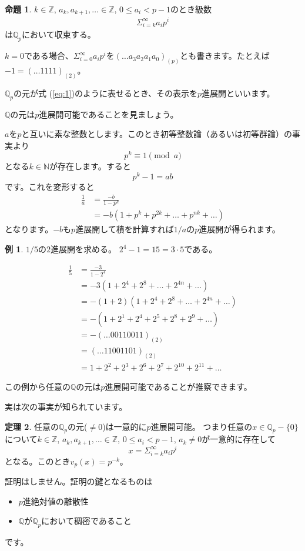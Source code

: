 \documentclass[uplatex]{jsarticle}
\newcommand{\Z}{\mathbb{Z}}
\newcommand{\Q}{\mathbb{Q}}
\theoremstyle{definition} %
\newtheorem{thm}{定理}
\newtheorem{prop}[thm]{命題}
\newtheorem*{example*}{例}
\begin{document}
\begin{oframed}\begin{prop}
$k \in \Z$, $a_k, a_{k+1}, \dots \in \Z$, $0 \le a_i < p-1$のとき級数
\begin{align}
\Sigma_{i=k}^\infty a_i p^i \label{eq:1}
\end{align}
は$\Q_p$において収束する。
\end{prop}\end{oframed}

$k=0$である場合、$\Sigma_{i=0}^\infty a_i p^i$を$(\dots a_3 a_2 a_1 a_0)_{(p)}$とも書きます。たとえば $-1 = (\dots 1 1 1 1)_{(2)}$。

$\Q_p$の元が式 (\ref{eq:1})のように表せるとき、その表示を$p$進展開といいます。

$\Q$の元は$p$進展開可能であることを見ましょう。

$a$を$p$と互いに素な整数とします。このとき初等整数論（あるいは初等群論）の事実より
\[p^k \equiv 1 \pmod a\]
となる$k \in \mathbb{N}$が存在します。すると
\[p^k-1 = ab\]
です。これを変形すると
\begin{align*}
\frac{1}{a} &= \frac{-b}{1-p^k} \\
&= -b(1+p^k+p^{2k}+\dots+p^{nk}+\dots)
\end{align*}
となります。$-b$も$p$進展開して積を計算すれば$1/a$の$p$進展開が得られます。

\begin{example*}
$1/5$の$2$進展開を求める。
$2^4-1 = 15 = 3 \cdot 5$である。

\begin{align*}
\frac{1}{5} &= \frac{-3}{1-2^4} \\
&= -3 (1 + 2^4 + 2^8 + \dots+ 2^{4n} + \dots) \\
&= -(1+2) (1 + 2^4 + 2^8 + \dots+ 2^{4n} + \dots) \\
&= -(1 + 2^1 + 2^4 + 2^5 + 2^8 + 2^9 + \dots) \\
&= -(\dots 00110011)_{(2)} \\
&= (\dots 11001101)_{(2)} \\
&= 1 + 2^2 + 2^3 + 2^6 + 2^7 + 2^{10} + 2^{11} + \dots
\end{align*}
\end{example*}

この例から任意の$\Q$の元は$p$進展開可能であることが推察できます。

実は次の事実が知られています。
\begin{oframed}\begin{thm}
任意の$\Q_p$の元($\ne 0$)は一意的に$p$進展開可能。
つまり任意の$x \in \Q_p- \{0\}$について$k \in \Z$, $a_k, a_{k+1}, \dots \in \Z$, $0 \le a_i < p-1$, $a_k \ne 0$が一意的に存在して
\[x = \Sigma_{i=k}^\infty a_i p^i\]
となる。このとき$v_p(x) = p^{-k}$。
\end{thm}\end{oframed}
証明はしません。証明の鍵となるものは
\begin{itemize}
\item $p$進絶対値の離散性
\item $\Q$が$\Q_p$において稠密であること
\end{itemize}
です。
\end{document}
